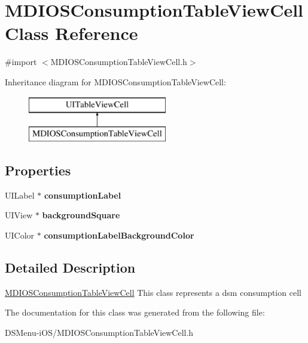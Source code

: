 \hypertarget{interface_m_d_i_o_s_consumption_table_view_cell}{\section{M\-D\-I\-O\-S\-Consumption\-Table\-View\-Cell Class Reference}
\label{interface_m_d_i_o_s_consumption_table_view_cell}
}


{\ttfamily \#import $<$M\-D\-I\-O\-S\-Consumption\-Table\-View\-Cell.\-h$>$}

Inheritance diagram for M\-D\-I\-O\-S\-Consumption\-Table\-View\-Cell\-:\begin{figure}[H]
\begin{center}
\leavevmode
\includegraphics[height=2.000000cm]{interface_m_d_i_o_s_consumption_table_view_cell}
\end{center}
\end{figure}
\subsection*{Properties}
\begin{DoxyCompactItemize}
\item 
\hypertarget{interface_m_d_i_o_s_consumption_table_view_cell_a49b8bbcb1fe5e26d7d903ac3a756d1c5}{U\-I\-Label $\ast$ {\bfseries consumption\-Label}}\label{interface_m_d_i_o_s_consumption_table_view_cell_a49b8bbcb1fe5e26d7d903ac3a756d1c5}

\item 
\hypertarget{interface_m_d_i_o_s_consumption_table_view_cell_ae331fc168a3eb82213950814641a5c63}{U\-I\-View $\ast$ {\bfseries background\-Square}}\label{interface_m_d_i_o_s_consumption_table_view_cell_ae331fc168a3eb82213950814641a5c63}

\item 
\hypertarget{interface_m_d_i_o_s_consumption_table_view_cell_af49ec2c7be7433127e4048675645dfcf}{U\-I\-Color $\ast$ {\bfseries consumption\-Label\-Background\-Color}}\label{interface_m_d_i_o_s_consumption_table_view_cell_af49ec2c7be7433127e4048675645dfcf}

\end{DoxyCompactItemize}


\subsection{Detailed Description}
\hyperlink{interface_m_d_i_o_s_consumption_table_view_cell}{M\-D\-I\-O\-S\-Consumption\-Table\-View\-Cell} This class represents a dsm consumption cell 

The documentation for this class was generated from the following file\-:\begin{DoxyCompactItemize}
\item 
D\-S\-Menu-\/i\-O\-S/M\-D\-I\-O\-S\-Consumption\-Table\-View\-Cell.\-h\end{DoxyCompactItemize}
